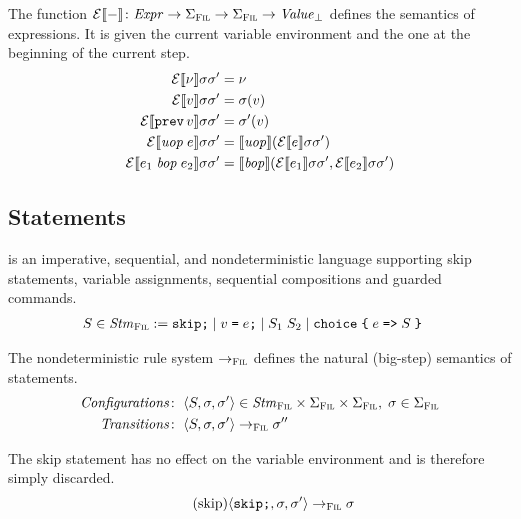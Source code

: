 \documentclass[a4paper,10pt,english]{article}
\begin{document}
The function $\mathcal{E} \llbracket - \rrbracket \colon \mathit{Expr} \rightarrow \Sigma_\textsc{Fil} \rightarrow \Sigma_\textsc{Fil} \rightarrow \mathit{Value}_\bot$ defines the
semantics of expressions. It is given the current variable environment and the one at the beginning of the current step.
\begin{align*}
	\mathcal{E} \llbracket \nu \rrbracket \sigma \sigma' &= \nu \\
	\mathcal{E} \llbracket v \rrbracket \sigma \sigma' &= \sigma(v) \\
	\mathcal{E} \llbracket \mathtt{prev} \,v \rrbracket \sigma \sigma' &= \sigma'(v) \\
	\mathcal{E} \llbracket \mathit{uop}\; e \rrbracket \sigma \sigma' &= \llbracket \mathit{uop} \rrbracket (\mathcal{E} \llbracket e \rrbracket \sigma \sigma')
	\\
	\mathcal{E} \llbracket e_1 \;\mathit{bop}\; e_2 \rrbracket \sigma \sigma' &= \llbracket \mathit{bop} \rrbracket (\mathcal{E} \llbracket e_1 \rrbracket
	\sigma \sigma', \mathcal{E} \llbracket e_2 \rrbracket \sigma \sigma')
\end{align*}

\subsection{Statements}

\Fil is an imperative, sequential, and nondeterministic language supporting skip statements, variable assignments, sequential
compositions and guarded commands.
\begin{align*}
	S \in \mathit{Stm}_\textsc{Fil} & :=
		\texttt{skip;} \mid 
		v\; \texttt{=}\; e \texttt{;} \mid 
		S_1 \; S_2 \mid
		\texttt{choice} \; \texttt{\{} \; e \; \texttt{=>} \; S \; \texttt{\}}
\end{align*}

The nondeterministic rule system $\rightarrow_{\textsc{Fil}}$ defines the natural (big-step) semantics of statements.
\begin{align*}
	\mathit{Configurations} \colon & \;\langle S, \sigma, \sigma' \rangle \in \mathit{Stm}_\textsc{Fil} \times \Sigma_\textsc{Fil} \times
	\Sigma_\textsc{Fil}, \; \sigma \in \Sigma_\textsc{Fil}
	\\
	\mathit{Transitions} \colon & \;\langle S, \sigma, \sigma' \rangle \rightarrow_{\textsc{Fil}} \sigma''
\end{align*}

The skip statement has no effect on the variable environment and is therefore simply discarded.
\begin{equation*}
	\tag{skip}
	\langle \texttt{skip;}, \sigma, \sigma' \rangle
		\rightarrow_{\textsc{Fil}}
	\sigma
\end{equation*}
\end{document}
